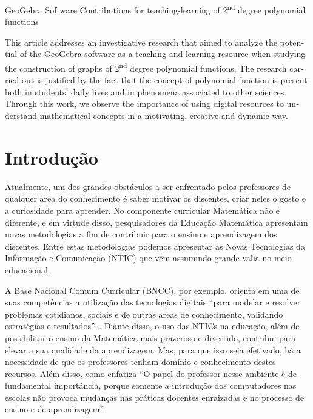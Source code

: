 \begin{refsection}
    
    \begin{otherlanguage}{english}
    
    \fakeChapterOneLine
    {GeoGebra Software Contributions for teaching\-{}-learning of 2\textsuperscript{nd} degree polynomial functions}
    
    \begin{galoResumo}[Abstract]
        This article addresses an investigative research that aimed to analyze the potential of the GeoGebra software as a teaching and learning resource when studying the construction of graphs of 2\textsuperscript{nd} degree polynomial functions. The research carried out is justified by the fact that the concept of polynomial function is present both in students' daily lives and in phenomena associated to other sciences. Through this work, we observe the importance of using digital resources to understand mathematical concepts in a motivating, creative and dynamic way.
    \end{galoResumo}
    
    \end{otherlanguage}
    

    \section{Introdução}

    Atualmente, um dos grandes obstáculos a ser enfrentado pelos professores de qualquer área do conhecimento é saber motivar os discentes, criar neles o gosto e a curiosidade para aprender. No componente curricular Matemática não é diferente, e em virtude disso, pesquisadores da Educação Matemática apresentam novas metodologias a fim de contribuir para o ensino e aprendizagem dos discentes. Entre estas metodologias podemos apresentar as Novas Tecnologias da Informação e Comunicação (NTIC) que vêm assumindo grande valia no meio educacional.  

    A Base Nacional Comum Curricular (BNCC), por exemplo, orienta em uma de suas competências a utilização das tecnologias digitais “para modelar e resolver problemas cotidianos, sociais e de outras áreas de conhecimento, validando estratégias e resultados”. \cite[p.~267]{DocumentoInstitucional2016Base}. Diante disso, o uso das NTICs na educação, além de possibilitar o ensino da Matemática mais prazeroso e divertido, contribui para elevar a sua qualidade da aprendizagem. Mas, para que isso seja efetivado, há a necessidade de que os professores tenham domínio e conhecimento destes recursos.  Além disso, como enfatiza \textcite[p.~102]{CARNEIROAndoAndPASSOS2014utilização} “O papel do professor nesse ambiente é de fundamental importância, porque somente a introdução dos computadores nas escolas não provoca mudanças nas práticas docentes enraizadas e no processo de ensino e de aprendizagem” 


\end{refsection}
